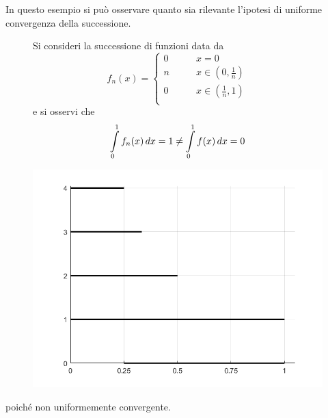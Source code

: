 \begin{example}
    In questo esempio si può osservare quanto sia rilevante l'ipotesi di uniforme convergenza della successione.
    \begin{figure}[H]
        \centering
        \begin{minipage}{0.5\textwidth}
            Si consideri la successione di funzioni data da 
            \begin{equation*}
            f_n(x)=\begin{cases}
            0 &\qquad x=0\\
            n & \qquad x \in (0, \frac{1}{n})\\
            0 &\qquad x \in (\frac{1}{n}, 1)\\
            \end{cases}
            \end{equation*}
            e si osservi che
            \begin{equation*}
                \int\limits_{0}^{1}{f_n(x)}\,dx=1 \neq \int\limits_{0}^{1}{f(x)}\,dx = 0
            \end{equation*}
        \end{minipage}
        \begin{minipage}{0.4\textwidth}
        \includegraphics[width=\textwidth]{Capitoli/Capitolo7/Esempio integrale succ. funz..png}
        \end{minipage}
    \end{figure}
    poiché non uniformemente convergente.
\end{example}
